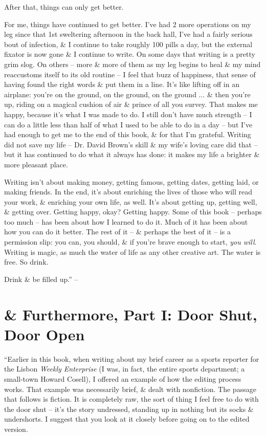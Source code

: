 \documentclass{article}
\numberwithin{equation}{section}
\begin{document}
After that, things can only get better.

 For me, things have continued to get better. I've had 2 more operations on my leg since that 1st sweltering afternoon in the back hall, I've had a fairly serious bout of infection, \& I continue to take roughly 100 pills a day, but the external fixator is now gone \& I continue to write. On some days that writing is a pretty grim slog. On others -- more \& more of them as my leg begins to heal \& my mind reaccustoms itself to its old routine -- I feel that buzz of happiness, that sense of having found the right words \& put them in a line. It's like lifting off in an airplane: you're on the ground, on the ground, on the ground $\ldots$ \& then you're up, riding on a magical cushion of air \& prince of all you survey. That makes me happy, because it's what I was made to do. I still don't have much strength -- I can do a little less than half of what I used to be able to do in a day -- but I've had enough to get me to the end of this book, \& for that I'm grateful. Writing did not save my life -- Dr. David Brown's skill \& my wife's loving care did that -- but it has continued to do what it always has done: it makes my life a brighter \& more pleasant place.

Writing isn't about making money, getting famous, getting dates, getting laid, or making friends. In the end, it's about enriching the lives of those who will read your work, \& enriching your own life, as well. It's about getting up, getting well, \& getting over. Getting happy, okay? Getting happy. Some of this book -- perhaps too much -- has been about how I learned to do it. Much of it has been about how you can do it better. The rest of it -- \& perhaps the best of it -- is a permission slip: you can, you should, \& if you're brave enough to start, \textit{you will}. Writing is magic, as much the water of life as any other creative art. The water is free. So drink.

Drink \& be filled up.'' -- \cite[pp. 204--217]{King2010}


\section{\& Furthermore, Part I: Door Shut, Door Open}
``Earlier in this book, when writing about my brief career as a sports reporter for the Lisbon \textit{Weekly Enterprise} (I was, in fact, the entire sports department; a small-town Howard Cosell), I offered an example of how the editing process works. That example was necessarily brief, \& dealt with nonfiction. The passage that follows is fiction. It is completely raw, the sort of thing I feel free to do with the door shut -- it's the story undressed, standing up in nothing but its socks \& undershorts. I suggest that you look at it closely before going on to the edited version.
\end{document}
